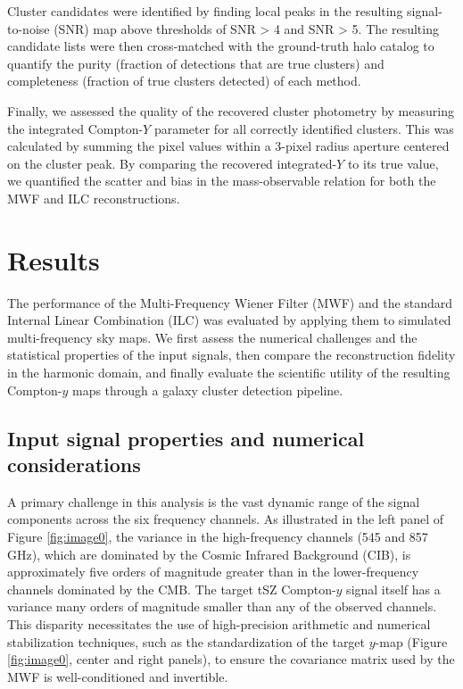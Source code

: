\documentclass[]{article}
\begin{document}
Cluster candidates were identified by finding local peaks in the resulting signal-to-noise (SNR) map above thresholds of SNR > 4 and SNR > 5. The resulting candidate lists were then cross-matched with the ground-truth halo catalog to quantify the purity (fraction of detections that are true clusters) and completeness (fraction of true clusters detected) of each method.

Finally, we assessed the quality of the recovered cluster photometry by measuring the integrated Compton-$Y$ parameter for all correctly identified clusters. This was calculated by summing the pixel values within a 3-pixel radius aperture centered on the cluster peak. By comparing the recovered integrated-$Y$ to its true value, we quantified the scatter and bias in the mass-observable relation for both the MWF and ILC reconstructions.

\section{Results}
\label{sec:results}
The performance of the Multi-Frequency Wiener Filter (MWF) and the standard Internal Linear Combination (ILC) was evaluated by applying them to simulated multi-frequency sky maps. We first assess the numerical challenges and the statistical properties of the input signals, then compare the reconstruction fidelity in the harmonic domain, and finally evaluate the scientific utility of the resulting Compton-$y$ maps through a galaxy cluster detection pipeline.

\subsection{Input signal properties and numerical considerations}

A primary challenge in this analysis is the vast dynamic range of the signal components across the six frequency channels. As illustrated in the left panel of Figure \ref{fig:image0}, the variance in the high-frequency channels (545 and 857 GHz), which are dominated by the Cosmic Infrared Background (CIB), is approximately five orders of magnitude greater than in the lower-frequency channels dominated by the CMB. The target tSZ Compton-$y$ signal itself has a variance many orders of magnitude smaller than any of the observed channels. This disparity necessitates the use of high-precision arithmetic and numerical stabilization techniques, such as the standardization of the target $y$-map (Figure \ref{fig:image0}, center and right panels), to ensure the covariance matrix used by the MWF is well-conditioned and invertible.
\end{document}
